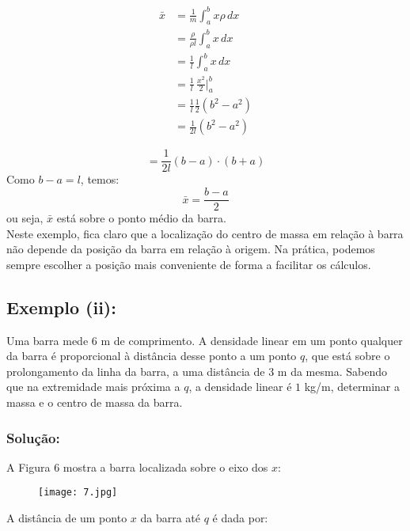 \documentclass[12pt,a4paper]{report}
\begin{document}
\begin{align*}
    \bar{x} &= \frac{1}{m} \int_{a}^{b} x \rho \, dx \\[0.2cm]
            &= \frac{\rho}{\rho l} \int_a^b x \, dx \\[0.2cm]
            &= \frac{1}{l} \int_a^b x \, dx \\[0.2cm]
            &= \frac{1}{l}\, \frac{x^2}{2}\Big|_a^b \\[0.2cm]
            &= \frac{1}{l} \frac{1}{2} (b^2 - a^2) \\[0.2cm]
            &= \frac{1}{2l} (b^2 - a^2)
\end{align*}

\[
    = \frac{1}{2l} (b - a)\cdot (b + a)
\]
\noindent
Como $b - a = l$, temos:
\[
\bar{x} = \frac{b - a}{2}
\]
ou seja, $\bar{x}$ est\'a sobre o ponto m\'edio da barra.\\

\noindent
Neste exemplo, fica claro que a localiza\c{c}\~ao do centro de massa em rela\c{c}\~ao \`a barra n\~ao depende da posi\c{c}\~ao da barra em rela\c{c}\~ao \`a origem. Na pr\'atica, podemos sempre escolher a posi\c{c}\~ao mais conveniente de forma a facilitar os c\'alculos.

\subsection*{Exemplo (ii):}

\noindent
Uma barra mede 6 m de comprimento. A densidade linear em um ponto qualquer da barra \'e proporcional \`a dist\^ancia desse ponto a um ponto $q$, que est\'a sobre o prolongamento da linha da barra, a uma dist\^ancia de 3 m da mesma. Sabendo que na extremidade mais pr\'oxima a $q$, a densidade linear \'e $1$ kg/m, determinar a massa e o centro de massa da barra.

\subsubsection*{Solu\c{c}\~ao:}

A Figura 6 mostra a barra localizada sobre o eixo dos $x$:

\begin{figure}[H]
    \centering
    \texttt{[image: 7.jpg]} %
    \caption{}
    \label{fig:ce}
\end{figure}

\noindent
A dist\^ancia de um ponto $x$ da barra at\'e $q$ \'e dada por:
\end{document}
